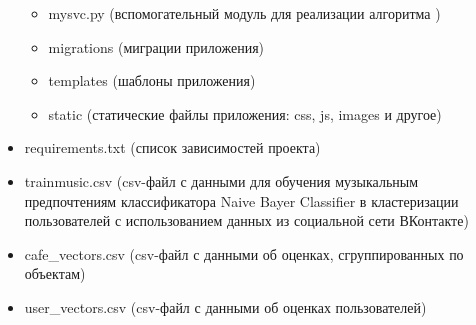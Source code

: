 \begin{itemize}
\begin{itemize}
    	\item mysvc.py (вспомогательный модуль для реализации алгоритма )
    	\item migrations (миграции приложения)
    	\item templates (шаблоны приложения)
    	\item static (статические файлы приложения: css, js, images и другое)
    \end{itemize}
    \item requirements.txt (список зависимостей проекта)
    \item trainmusic.csv (csv-файл с данными для обучения музыкальным предпочтениям классификатора Naive Bayer Classifier в кластеризации пользователей с использованием данных из социальной сети ВКонтакте)
    \item cafe\_vectors.csv (csv-файл с данными об оценках, сгруппированных по объектам)
    \item user\_vectors.csv (csv-файл с данными об оценках пользователей)
\end{itemize}


